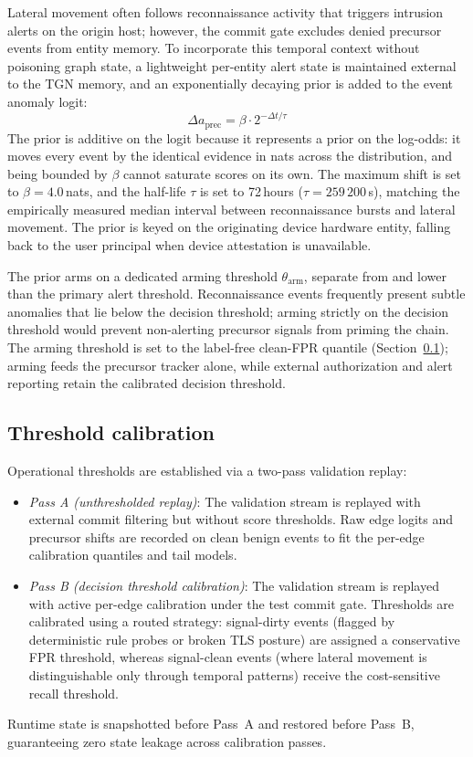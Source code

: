 Lateral movement often follows reconnaissance activity that triggers intrusion alerts on the
origin host; however, the commit gate excludes denied precursor events from entity memory.
To incorporate this temporal context without poisoning graph state, a lightweight
per-entity alert state is maintained external to the TGN memory, and an exponentially
decaying prior is added to the event anomaly logit:
\begin{equation}
\Delta a_{\text{prec}} = \beta \cdot 2^{-\Delta t / \tau}
\end{equation}
The prior is additive on the logit because it represents a prior on the log-odds: it moves every
event by the identical evidence in nats across the distribution, and being bounded by $\beta$
cannot saturate scores on its own. The maximum shift is set to $\beta = 4.0$\,nats, and the half-life
$\tau$ is set to 72\,hours ($\tau = 259\,200$\,s), matching the empirically measured median
interval between reconnaissance bursts and lateral movement. The prior is keyed on the originating
device hardware entity, falling back to the user principal when device attestation is unavailable.

The prior arms on a dedicated arming threshold $\theta_{\text{arm}}$, separate from and lower than
the primary alert threshold. Reconnaissance events frequently present subtle anomalies that lie below
the decision threshold; arming strictly on the decision threshold would prevent non-alerting
precursor signals from priming the chain. The arming threshold is set to the label-free clean-FPR
quantile (Section~\ref{sec:calib}); arming feeds the precursor tracker alone, while external
authorization and alert reporting retain the calibrated decision threshold.

\subsection{Threshold calibration}
\label{sec:calib}

Operational thresholds are established via a two-pass validation replay:
\begin{itemize}
  \item \textit{Pass A (unthresholded replay)}: The validation stream is replayed with external
  commit filtering but without score thresholds. Raw edge logits and precursor shifts are recorded
  on clean benign events to fit the per-edge calibration quantiles and tail models.
  \item \textit{Pass B (decision threshold calibration)}: The validation stream is replayed with
  active per-edge calibration under the test commit gate. Thresholds are calibrated using a routed
  strategy: signal-dirty events (flagged by deterministic rule probes or broken TLS posture) are
  assigned a conservative FPR threshold, whereas signal-clean events (where lateral movement is
  distinguishable only through temporal patterns) receive the cost-sensitive recall threshold.
\end{itemize}
Runtime state is snapshotted before Pass~A and restored before Pass~B, guaranteeing zero state
leakage across calibration passes.


